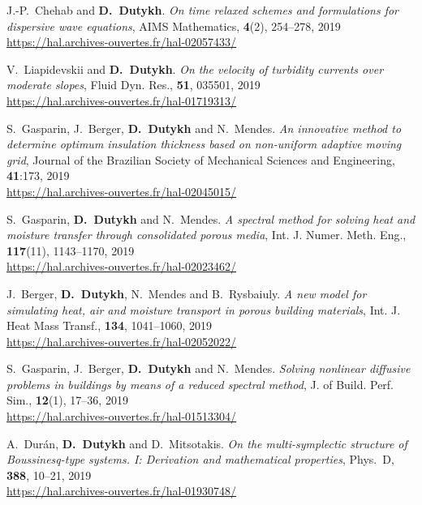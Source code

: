 \begin{etaremune}
  \item J.-P.~Chehab and \textbf{D.~Dutykh}. \textit{On time relaxed schemes and formulations for dispersive wave equations}, AIMS Mathematics, \textbf{4}(2), 254--278, 2019 \\ %
  \url{https://hal.archives-ouvertes.fr/hal-02057433/}
  
  \item V.~Liapidevskii and \textbf{D.~Dutykh}. \textit{On the velocity of turbidity currents over moderate slopes}, Fluid Dyn. Res., \textbf{51}, 035501, 2019 \\ %
  \url{https://hal.archives-ouvertes.fr/hal-01719313/}
  
  \item S.~Gasparin, J.~Berger, \textbf{D.~Dutykh} and N.~Mendes. \textit{An innovative method to determine optimum insulation thickness based on non-uniform adaptive moving grid}, Journal of the Brazilian Society of Mechanical Sciences and Engineering, \textbf{41}:173, 2019 \\ %
  \url{https://hal.archives-ouvertes.fr/hal-02045015/}
  
  \item S.~Gasparin, \textbf{D.~Dutykh} and N.~Mendes. \textit{A spectral method for solving heat and moisture transfer through consolidated porous media}, Int. J. Numer. Meth. Eng., \textbf{117}(11), 1143--1170, 2019 \\ %
  \url{https://hal.archives-ouvertes.fr/hal-02023462/}
  
  \item J.~Berger, \textbf{D.~Dutykh}, N.~Mendes and B.~Rysbaiuly. \textit{A new model for simulating heat, air and moisture transport in porous building materials}, Int. J. Heat Mass Transf., \textbf{134}, 1041--1060, 2019 \\ %
  \url{https://hal.archives-ouvertes.fr/hal-02052022/}
  
  \item S.~Gasparin, J.~Berger, \textbf{D.~Dutykh} and N.~Mendes. \textit{Solving nonlinear diffusive problems in buildings by means of a reduced spectral method}, J. of Build. Perf. Sim., \textbf{12}(1), 17--36, 2019 \\ %
  \url{https://hal.archives-ouvertes.fr/hal-01513304/}
  
  \item A.~Dur\'an, \textbf{D.~Dutykh} and D.~Mitsotakis. \textit{On the multi-symplectic structure of Boussinesq-type systems. I: Derivation and mathematical properties}, Phys.~D, \textbf{388}, 10--21, 2019 \\ %
  \url{https://hal.archives-ouvertes.fr/hal-01930748/}


\end{etaremune}
